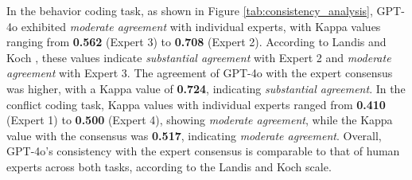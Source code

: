 



In the behavior coding task, as shown in Figure \ref{tab:consistency_analysis}, GPT-4o exhibited \textit{moderate agreement} with individual experts, with Kappa values ranging from \textbf{0.562} (Expert 3) to \textbf{0.708} (Expert 2). According to Landis and Koch \cite{landis1977measurement}, these values indicate \textit{substantial agreement} with Expert 2 and \textit{moderate agreement} with Expert 3. The agreement of GPT-4o with the expert consensus was higher, with a Kappa value of \textbf{0.724}, indicating \textit{substantial agreement}. In the conflict coding task, Kappa values with individual experts ranged from \textbf{0.410} (Expert 1) to \textbf{0.500} (Expert 4), showing \textit{moderate agreement}, while the Kappa value with the consensus was \textbf{0.517}, indicating \textit{moderate agreement}. Overall, GPT-4o’s consistency with the expert consensus is comparable to that of human experts across both tasks, according to the Landis and Koch scale.

